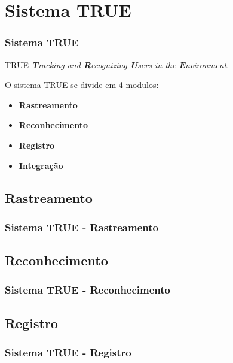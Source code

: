 \documentclass{beamer}
\begin{document}
\section{Sistema TRUE}

	\begin{frame}
    	\frametitle{Sistema TRUE}
    	
    	TRUE \rightarrow \textit{\textbf{T}racking and \textbf{R}ecognizing
    	\textbf{U}sers in the \textbf{E}nvironment}.
    	
    	O sistema TRUE se divide em 4 modulos:
    		\begin{itemize}
    		  \item \textbf{Rastreamento}
    		  \item \textbf{Reconhecimento}
    		  \item \textbf{Registro}
    		  \item \textbf{Integração}
    		\end{itemize}
    \end{frame}
    
    \subsection{Rastreamento}
		\begin{frame}
	    	\frametitle{Sistema TRUE - Rastreamento}
	    	
	    \end{frame}
    
    \subsection{Reconhecimento}
		\begin{frame}
	    	\frametitle{Sistema TRUE - Reconhecimento}
	    	
	    \end{frame}
    
    \subsection{Registro}
		\begin{frame}
	    	\frametitle{Sistema TRUE - Registro}
	    	
	    \end{frame}
    
\end{document}
